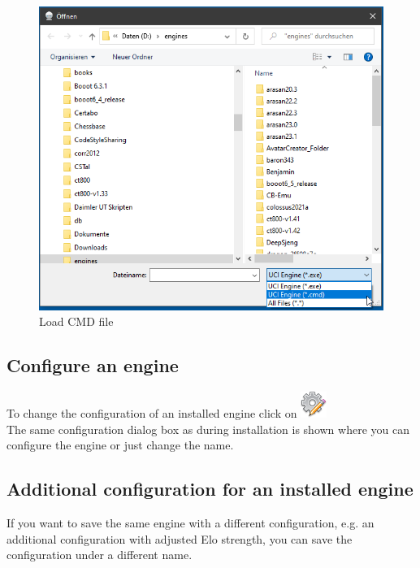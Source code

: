\documentclass[11pt,a4paper]{article}
\begin{document}
\begin{figure}[H]
	\centering
	\includegraphics[scale=0.8]{LoadEngineCmd.png}
	\caption{Load CMD file}
	\label{fig:LoadCMDfile}
\end{figure}


\subsection{Configure an engine}

To change the configuration of an installed engine click on \includegraphics[scale=0.5]{cog_edit.png}\\
The same configuration dialog box as during installation is shown where you can configure the engine or just change the name.

\subsection{Additional configuration for an installed engine}

If you want to save the same engine with a different configuration, e.g. an additional configuration with adjusted Elo strength, you can save the configuration under a different name.
\end{document}
